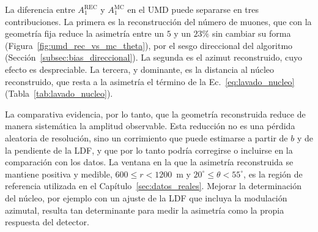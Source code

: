La diferencia entre $A_1^{\mathrm{REC}}$ y $A_1^{\mathrm{MC}}$ en el UMD puede separarse en tres contribuciones. La primera es la reconstrucción del número de muones, que con la geometría fija reduce la asimetría entre un $5$ y un $23\%$ sin cambiar su forma (Figura~\ref{fig:umd_rec_vs_mc_theta}), por el sesgo direccional del algoritmo (Sección~\ref{subsec:bias_direccional}). La segunda es el azimut reconstruido, cuyo efecto es despreciable. La tercera, y dominante, es la distancia al núcleo reconstruido, que resta a la asimetría el término de la Ec.~\ref{eq:lavado_nucleo} (Tabla~\ref{tab:lavado_nucleo}).

La comparativa evidencia, por lo tanto, que la geometría reconstruida reduce de manera sistemática la amplitud observable. Esta reducción no es una pérdida aleatoria de resolución, sino un corrimiento que puede estimarse a partir de $b$ y de la pendiente de la LDF, y que por lo tanto podría corregirse o incluirse en la comparación con los datos. La ventana en la que la asimetría reconstruida se mantiene positiva y medible, $600 \leq r < 1200$~m y $20^\circ \leq \theta < 55^\circ$, es la región de referencia utilizada en el Capítulo~\ref{sec:datos_reales}. Mejorar la determinación del núcleo, por ejemplo con un ajuste de la LDF que incluya la modulación azimutal, resulta tan determinante para medir la asimetría como la propia respuesta del detector.

